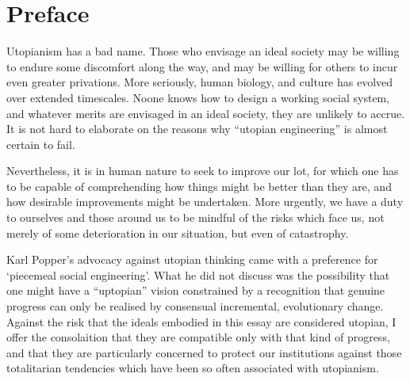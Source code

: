 \chapter*{Preface}

Utopianism has a bad name.
Those who envisage an ideal society may be willing to endure some discomfort along the way, and may be willing for others to incur even greater privations.
More seriously, human biology, and culture has evolved over extended timescales.
Noone knows how to design a working social system, and whatever merits are envisaged in an ideal society, they are unlikely to accrue.
It is not hard to elaborate on the reasons why ``utopian engineering'' is almost certain to fail.

Nevertheless, it is in human nature to seek to improve our lot, for which one has to be capable of comprehending how things might be better than they are, and how desirable improvements might be undertaken.
More urgently, we have a duty to ourselves and those around us to be mindful of the risks which face us, not merely of some deterioration in our situation, but even of catastrophy.

Karl Popper's advocacy against utopian thinking came with a preference for `piecemeal social engineering'.
What he did not discuss was the possibility that one might have a ``uptopian'' vision constrained by a recognition that genuine progress can only be realised by consensual incremental, evolutionary change.
Against the risk that the ideals embodied in this essay are considered utopian, I offer the consolaition that they are compatible only with that kind of progress, and that they are particularly concerned to protect our institutions against those totalitarian tendencies which have been so often associated with utopianism.
